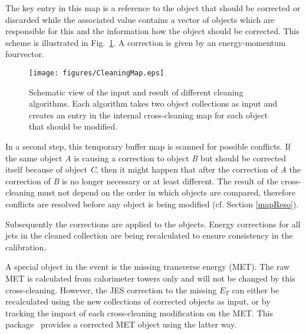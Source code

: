 \documentclass{cmspaper}
\begin{document}
The key entry in this map is a reference to the object that should be corrected
or discarded while the associated value contains a vector of objects which are
responsible for this and the information how the object should be corrected. This
scheme is illustrated in Fig.~\ref{fig:Cleaning}. A correction is given by an
energy-momentum fourvector.

\begin{figure}[hbt]
\begin{center}
\texttt{[image: figures/CleaningMap.eps]}
\caption{Schematic view of the input and result of different cleaning
    algorithms. Each algorithm takes two object collections as input and
    creates an entry in the internal cross-cleaning map for each object
    that should be modified.}
\label{fig:Cleaning}
\end{center}
\end{figure}

In a second step, this temporary buffer map is scanned for possible conflicts.
If the same object {\it A} is causing a correction to object {\it B} but should
be corrected itself because of object {\it C}, then it might happen that after
the correction of {\it A} the correction of {\it B} is no longer necessary or at
least different.
The result of the cross-cleaning must not depend on the order in which objects
are compared, therefore conflicts are resolved before any object is being
modified (cf. Section \ref{mapReso}).

Subsequently the corrections are applied to the objects. Energy corrections for
all jets in the cleaned collection are being recalculated to ensure consistency
in the calibration.

A special object in the event is the missing transverse energy (MET). The raw
MET is calculated from calorimeter towers only and will not be changed by this
cross-cleaning. However, the JES correction to the missing $E_T$ can either be
recalculated using the new collections of corrected objects as input, or by
tracking the impact of each cross-cleaning modification on the MET. This
package~\cite{package} provides a corrected MET object using the latter way.
\end{document}
